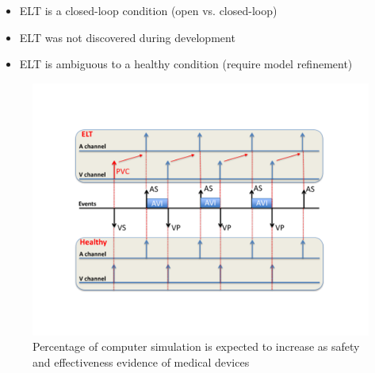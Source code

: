 %
\begin{itemize}
	\item ELT is a closed-loop condition (open vs. closed-loop)
	\item ELT was not discovered during development
	\item ELT is ambiguous to a healthy condition (require model refinement)
\end{itemize}
\begin{figure}[t]
		\centering
		\includegraphics[width=\textwidth]{figs/ambiguity.pdf}
		\caption{\small Percentage of computer simulation is expected to increase as safety and effectiveness evidence of medical devices}
		\label{fig:ambiguity}
\end{figure}

